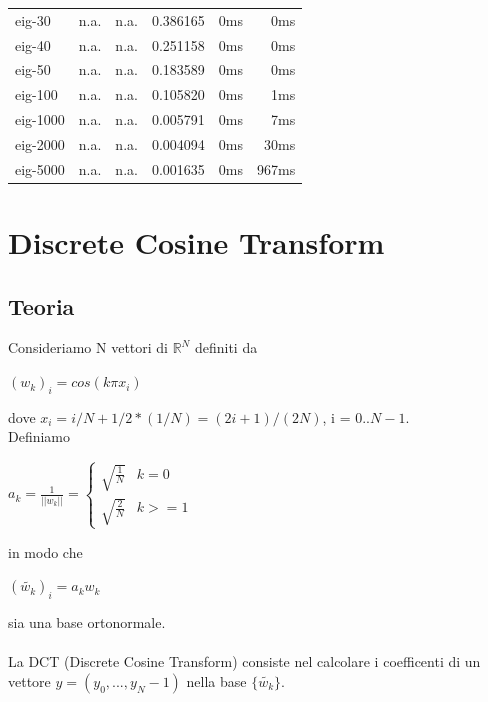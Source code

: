 \documentclass[12pt]{article}
\begin{document}
\begin{table}[h]
\begin{center}
\begin{tabular}{|l|r|r|r|r|r|}
      eig-30 &	            n.a. &	              n.a. &           0.386165 & 	0ms		 &			0ms   \\
      eig-40 &	            n.a. &	              n.a. &           0.251158 & 	0ms		 &			0ms   \\
      eig-50 &	            n.a. &	              n.a. &           0.183589 & 	0ms		 &			0ms   \\
     eig-100 &	            n.a. &	              n.a. &           0.105820 & 	0ms		 &			1ms   \\
    eig-1000 &	            n.a. &	              n.a. &           0.005791 & 	0ms		 &			7ms   \\
    eig-2000 &	            n.a. &	              n.a. &           0.004094 & 	0ms		&			30ms   \\
    eig-5000 &	            n.a. &	              n.a. &           0.001635 &	0ms		&			967ms   \\
\hline
\end{tabular}
\end{center}
\end{table}

\newpage
\section{Discrete Cosine Transform}
\subsection{Teoria}
Consideriamo N vettori di $\mathbb{R}^N$ definiti da 
\begin{center} $(w_k)_i = cos(k{\pi}x_i)$ \end{center}
dove $x_i = i/N + 1/2*(1/N) = (2i+1)/(2N)$, i = $0..N-1$.\\
Definiamo
\begin{center} $a_k = \frac{1}{||w_k||} = \left\{ \begin{array}{ll} \sqrt{\frac{1}{N}} & k=0\\ \sqrt{\frac{2}{N}} & k >= 1\end{array}\right.$ \end{center}
in modo che 
\begin{center} $(\tilde{w_k})_i = a_kw_k$ \end{center}
sia una base ortonormale. \\\\
La DCT (Discrete Cosine Transform) consiste nel calcolare i coefficenti di un vettore $y = (y_0,...,y_N-1)$ nella base $\{\tilde{w_k}\}$.
\end{document}
